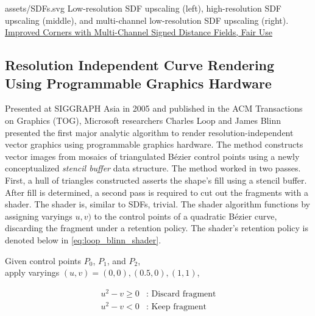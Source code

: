 \widesvg
{assets/SDFs.svg}
{Low-resolution SDF upscaling (left), high-resolution SDF upscaling (middle), and multi-channel low-resolution SDF upscaling (right).\label{fig:sdf}}
{\href{https://doi.org/10.1111/cgf.13265}{Improved Corners with Multi-Channel Signed Distance Fields, Fair Use}}

\subsection{Resolution Independent Curve Rendering Using Programmable Graphics Hardware}\label{sec:LoopBlinn}
Presented at SIGGRAPH Asia in 2005 and published in the ACM Transactions on Graphics (TOG), Microsoft researchers Charles Loop and James Blinn presented the first major analytic algorithm to render resolution-independent vector graphics using programmable graphics hardware. The method constructs vector images from mosaics of triangulated Bézier control points using a newly conceptualized \emph{stencil buffer} data structure\cite{Loop05}. The method worked in two passes. First, a hull of triangles constructed asserts the shape's fill using a stencil buffer. After fill is determined, a second pass is required to cut out the fragments with a shader. The shader is, similar to SDFs, trivial. The shader algorithm functions by assigning varyings \(u, v)\) to the control points of a quadratic Bézier curve, discarding the fragment under a retention policy. The shader's retention policy is denoted below in \cref{eq:loop_blinn_shader}.\medskip

\begin{center}
Given control points \(P_0\), \(P_1\), and \(P_2\),\\
apply varyings \((u, v) = (0, 0), (0.5, 0), (1, 1)\),
\end{center}
\begin{equation}\label{eq:loop_blinn_shader}
    \begin{split}
        u^2 - v \ge 0 & \text{: Discard fragment} \\
        u^2 - v < 0 & \text{: Keep fragment}
    \end{split}
\end{equation}
\medskip


